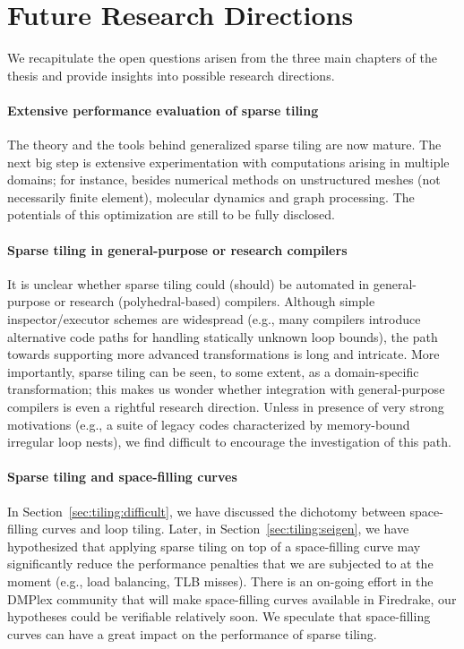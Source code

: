\section{Future Research Directions}
We recapitulate the open questions arisen from the three main chapters of the thesis and provide insights into possible research directions. 

\paragraph{Extensive performance evaluation of sparse tiling}
The theory and the tools behind generalized sparse tiling are now mature. The next big step is extensive experimentation with computations arising in multiple domains; for instance, besides numerical methods on unstructured meshes (not necessarily finite element), molecular dynamics and graph processing. The potentials of this optimization are still to be fully disclosed. 

\paragraph{Sparse tiling in general-purpose or research compilers}
It is unclear whether sparse tiling could (should) be automated in general-purpose or research (polyhedral-based) compilers. Although simple inspector/executor schemes are widespread (e.g., many compilers introduce alternative code paths for handling statically unknown loop bounds), the path towards supporting more advanced transformations is long and intricate. More importantly, sparse tiling can be seen, to some extent, as a domain-specific transformation; this makes us wonder whether integration with general-purpose compilers is even a rightful research direction. Unless in presence of very strong motivations (e.g., a suite of legacy codes characterized by memory-bound irregular loop nests), we find difficult to encourage the investigation of this path.

\paragraph{Sparse tiling and space-filling curves}
In Section~\ref{sec:tiling:difficult}, we have discussed the dichotomy between space-filling curves and loop tiling. Later, in Section~\ref{sec:tiling:seigen}, we have hypothesized that applying sparse tiling on top of a space-filling curve may significantly reduce the performance penalties that we are subjected to at the moment (e.g., load balancing, TLB misses). There is an on-going effort in the DMPlex community that will make space-filling curves available in Firedrake, our hypotheses could be verifiable relatively soon. We speculate that space-filling curves can have a great impact on the performance of sparse tiling.

